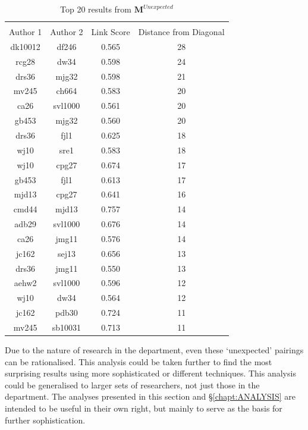\begin{table}[H]
\centering
\caption{Top 20 results from $\mathbf{M}^{Unexpected}$}
\label{tab:unexp}
\begin{tabular}{||c|c|c|c||}
\hline
\\Author 1 & Author 2 & Link Score & Distance from Diagonal\\
\hline
dk10012 & df246 & 0.565 & 28 \\ 
rcg28 & dw34 & 0.598 & 24 \\ 
drs36 & mjg32 & 0.598 & 21 \\ 
mv245 & ch664 & 0.583 & 20 \\
ca26 & svl1000 & 0.561 & 20 \\ 
gb453 & mjg32 & 0.560 & 20 \\ 
drs36 & fjl1 & 0.625 & 18 \\ 
wj10 & sre1 & 0.583 & 18 \\ 
wj10 & cpg27 & 0.674 & 17 \\ 
gb453 & fjl1 & 0.613 & 17 \\ 
mjd13 & cpg27 & 0.641 & 16 \\ 
cmd44 & mjd13 & 0.757 & 14 \\
adb29 & svl1000 & 0.676 & 14 \\ 
ca26 & jmg11 & 0.576 & 14 \\ 
jc162 & sej13 & 0.656 & 13 \\ 
drs36 & jmg11 & 0.550 & 13 \\
aehw2 & svl1000 & 0.596 & 12 \\ 
wj10 & dw34 & 0.564 & 12 \\ 
jc162 & pdb30 & 0.724 & 11 \\ 
mv245 & sb10031 & 0.713 & 11 \\ 
\hline
\end{tabular}
\end{table}
Due to the nature of research in the department, even these `unexpected' pairings can be rationalised. This analysis could be taken further to find the most surprising results using more sophisticated or different techniques. This analysis could be generalised to larger sets of researchers, not just those in the department. The analyses presented in this section and \S\ref{chapt:ANALYSIS} are intended to be useful in their own right, but mainly to serve as the basis for further sophistication.